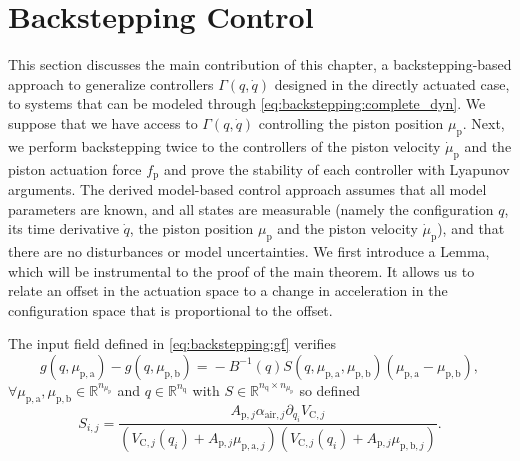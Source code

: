 \section{Backstepping Control}\label{sec:backstepping:backstepping_proof}

This section discusses the main contribution of this chapter, a backstepping-based approach to generalize controllers $\Gamma(q,\dot{q})$ designed in the directly actuated case, to systems that can be modeled through \eqref{eq:backstepping:complete_dyn}.
We suppose that we have access to $\Gamma(q, \dot{q})$ controlling the piston position $\mu_\mathrm{p}$. Next, we perform backstepping twice to the controllers of the piston velocity $\dot{\mu}_\mathrm{p}$ and the piston actuation force $f_\mathrm{p}$ and prove the stability of each controller with Lyapunov arguments.
The derived model-based control approach assumes that all model parameters are known, and all states are measurable (namely the configuration $q$, its time derivative $\dot{q}$, the piston position $\mu_\mathrm{p}$ and the piston velocity $\dot{\mu}_\mathrm{p}$), and that there are no disturbances or model uncertainties. 
We first introduce a Lemma, which will be instrumental to the proof of the main theorem. It allows us to relate an offset in the actuation space to a change in acceleration in the configuration space that is proportional to the offset.
%
\begin{lemma}\label{lemma:f_g_S}%
The input field defined in \eqref{eq:backstepping:gf} verifies
%
\begin{equation*}
    g(q,\mu_{\mathrm{p},\mathrm{a}}) - g(q,\mu_{\mathrm{p},\mathrm{b}}) \!=\!  -B^{-1}\!(q)S(q,\mu_{\mathrm{p},\mathrm{a}},\mu_{\mathrm{p},\mathrm{b}})(\mu_{\mathrm{p},\mathrm{a}} \!- \mu_{\mathrm{p},\mathrm{b}}),    
\end{equation*}
%
$\forall \mu_{\mathrm{p},\mathrm{a}},\mu_{\mathrm{p},\mathrm{b}} \in \mathbb{R}^{n_{\mu_\mathrm{p}}}$ and $q \in \mathbb{R}^{n_{\mathrm{q}}}$
	with $S \in \mathbb{R}^{n_{\mathrm{q}} \times n_{\mu_\mathrm{p}}} $ so defined
	\begin{equation*}
	    S_{i,j} = \frac{ A_{\mathrm{p},j} \alpha_{\mathrm{air},j} \partial_{q_i}V_{\mathrm{C},j}}{(V_{\mathrm{C},j}(q_i) + A_{\mathrm{p},j} \mu_{\mathrm{p},\mathrm{a},j})(V_{\mathrm{C},j}(q_i) + A_{\mathrm{p},j} \mu_{\mathrm{p},\mathrm{b},j})}.
	\end{equation*}
\end{lemma}
%
